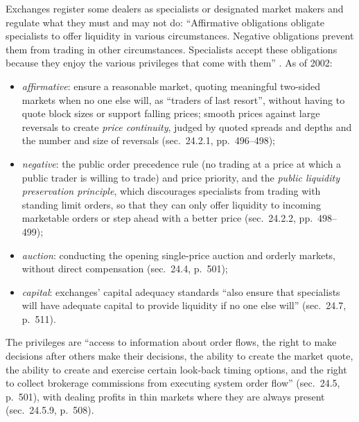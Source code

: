 \begin{qfdefinition}\label{def:specialist-obligations-privileges}
 Exchanges register some dealers as specialists or designated market makers and regulate what they must and may not do: ``Affirmative obligations obligate specialists to offer liquidity in various circumstances. Negative obligations prevent them from trading in other circumstances. Specialists accept these obligations because they enjoy the various privileges that come with them'' \citep[chap.~24, sec.~24.2, p.~496]{alpha-harris}. As of 2002:
\begin{itemize}\setlength{\itemsep}{0pt}
\item \emph{affirmative}: ensure a reasonable market, quoting meaningful two-sided markets when no one else will, as ``traders of last resort'', without having to quote block sizes or support falling prices; smooth prices against large reversals to create \emph{price continuity}, judged by quoted spreads and depths and the number and size of reversals (sec.~24.2.1, pp.~496--498);
\item \emph{negative}: the public order precedence rule (no trading at a price at which a public trader is willing to trade) and price priority, and the \emph{public liquidity preservation principle}, which discourages specialists from trading with standing limit orders, so that they can only offer liquidity to incoming marketable orders or step ahead with a better price (sec.~24.2.2, pp.~498--499);
\item \emph{auction}: conducting the opening single-price auction and orderly markets, without direct compensation (sec.~24.4, p.~501);
\item \emph{capital}: exchanges' capital adequacy standards ``also ensure that specialists will have adequate capital to provide liquidity if no one else will'' (sec.~24.7, p.~511).
\end{itemize}
The privileges are ``access to information about order flows, the right to make decisions after others make their decisions, the ability to create the market quote, the ability to create and exercise certain look-back timing options, and the right to collect brokerage commissions from executing system order flow'' (sec.~24.5, p.~501), with dealing profits in thin markets where they are always present (sec.~24.5.9, p.~508).


\end{qfdefinition}
